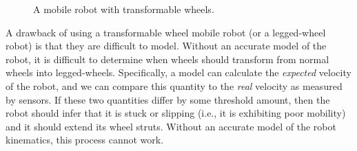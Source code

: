 \begin{figure}[!ht]
    \centering

    \quad

    \vspace{-0.1in}

    \caption{A mobile robot with transformable wheels.}
    \label{fig:robot}

    \vspace{-0.45in}

\end{figure}

A drawback of using a transformable wheel mobile robot (or a legged-wheel robot) is that they are difficult to model.
%
Without an accurate model of the robot, it is difficult to determine when wheels should transform from normal wheels into legged-wheels.
%
Specifically, a model can calculate the \emph{expected} velocity of the robot, and we can compare this quantity to the \emph{real} velocity as measured by sensors. If these two quantities differ by some threshold amount, then the robot should infer that it is stuck or slipping (i.e., it is exhibiting poor mobility) and it should extend its wheel struts.
%
Without an accurate model of the robot kinematics, this process cannot work.



